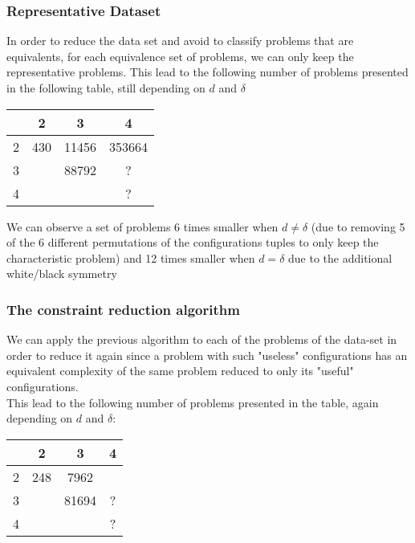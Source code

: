 \documentclass{article}
\theoremstyle{definition}
\newcommand{\wdd}[0]{d}
\newcommand{\bdd}[0]{\delta}
\begin{document}
\subsubsection{Representative Dataset}
In order to reduce the data set and avoid to classify problems that are equivalents, for each equivalence set of problems, we can only keep the representative problems. This lead to the following number of problems presented in the following table, still depending on $\wdd$ and $\bdd$
\begin{center}
\begin{tabular}{ | c | c | c | c |}
 \hline
 \diagbox{$\wdd$}{$\bdd$} & 2 & 3 & 4 \\ 
 \hline
 2 & 430 & 11456 & 353664\\
 \hline
 3 &  & 88792 & ?\\
 \hline
 4 &  &  &  ?\\
\hline
\end{tabular}
\end{center}
We can observe a set of problems 6 times smaller when $\wdd \neq \bdd$ (due to removing 5 of the 6 different permutations of the configurations tuples to only keep the characteristic problem) and 12 times smaller when $\wdd=\bdd$ due to the additional white/black symmetry
\subsubsection{The constraint reduction algorithm}

We can apply the previous algorithm to each of the problems of the data-set in order to reduce it again since a problem with such "useless" configurations has an equivalent complexity of the same problem reduced to only its "useful" configurations.\\
This lead to the following number of problems presented in the table, again depending on $\wdd$ and $\bdd$:
\begin{center}
\begin{tabular}{ | c | c | c | c |}
 \hline
 \diagbox{$\wdd$}{$\bdd$} & 2 & 3 & 4 \\ 
 \hline
 2 & 248 & 7962 & \\
 \hline
 3 &  & 81694 & ?\\
 \hline
 4 &  &  &  ?\\
\hline
\end{tabular}
\end{center}
\end{document}
